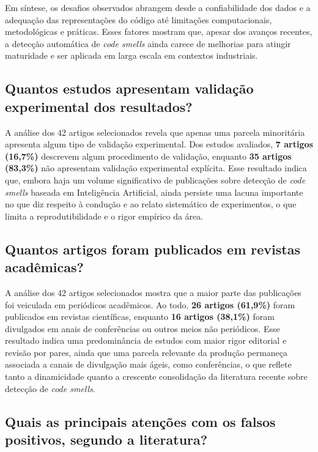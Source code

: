 {Em síntese, os desafios observados abrangem desde a confiabilidade dos dados e a 
adequação das representações do código até limitações computacionais, metodológicas e 
práticas. Esses fatores mostram que, apesar dos avanços recentes, a detecção automática 
de \textit{code smells} ainda carece de melhorias para atingir maturidade e ser aplicada 
em larga escala em contextos industriais.

\subsection{Quantos estudos apresentam validação experimental dos resultados?}

A análise dos 42 artigos selecionados revela que apenas uma parcela minoritária apresenta algum
tipo de validação experimental. Dos estudos avaliados, \textbf{7 artigos (16,7\%)} descrevem algum
procedimento de validação, enquanto \textbf{35 artigos (83,3\%)} não
apresentam validação experimental explícita. Esse resultado indica que, embora haja um volume
significativo de publicações sobre detecção de \textit{code smells} baseada em Inteligência Artificial,
ainda persiste uma lacuna importante no que diz respeito à condução e ao relato sistemático de
experimentos, o que limita a reprodutibilidade e o rigor empírico da área.


\subsection{Quantos artigos foram publicados em revistas acadêmicas?}

A análise dos 42 artigos selecionados mostra que a maior parte das publicações
foi veiculada em periódicos acadêmicos. Ao todo, \textbf{26 artigos (61,9\%)}
foram publicados em revistas científicas, enquanto \textbf{16 artigos (38,1\%)}
foram divulgados em anais de conferências ou outros meios não periódicos.
Esse resultado indica uma predominância de estudos com maior rigor editorial
e revisão por pares, ainda que uma parcela relevante da produção permaneça
associada a canais de divulgação mais ágeis, como conferências, o que reflete
tanto a dinamicidade quanto a crescente consolidação da literatura recente
sobre detecção de \textit{code smells}.



\subsection{Quais as principais atenções com os falsos positivos, segundo a literatura?}

}
